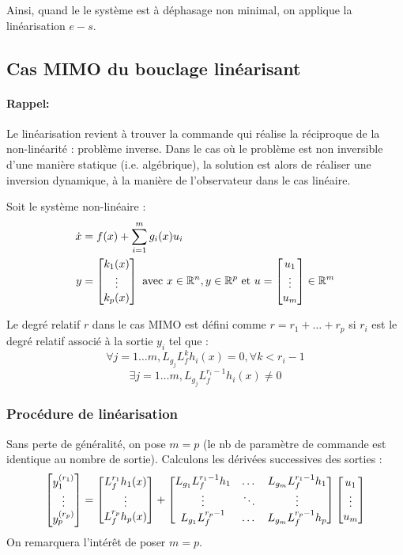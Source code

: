 \documentclass[main.tex]{subfiles}
\begin{document}
Ainsi, quand le le système est à déphasage non minimal, on applique la linéarisation $e-s$.


\subsection{Cas MIMO du bouclage linéarisant}
\paragraph{Rappel:}
Le linéarisation revient à trouver la commande qui réalise la réciproque de la non-linéarité : problème inverse. Dans le cas où le problème est non inversible d'une manière statique (i.e. algébrique), la solution est alors de réaliser une inversion dynamique, à la manière de  l'observateur dans le cas linéaire.

Soit le système non-linéaire :
\begin{align*}
\dot{x} & = f(x) + \sum_{i=1}^m g_i(x)u_i \\
y & = \begin{bmatrix} k_1(x) \\ \vdots \\ k_p(x) \end{bmatrix} \text{ avec } x\in\mathbb{R}^n,y \in \mathbb{R}^p \text{ et } u=\begin{bmatrix} u_1 \\ \vdots \\ u_m \end{bmatrix} \in \mathbb{R}^m 
\end{align*} 

\begin{defin}
Le degré relatif $r$ dans le cas MIMO est défini comme $r=r_1+\dots+r_p$ si $r_i$ est le degré relatif associé à la sortie $y_i$ tel que :
\[ \forall j=1\dots m, L_{g_j}L_f^k h_i(x) = 0, \forall k < r_i-1\]
\[ \exists j =1\dots m, L_{g_j}L_f^{r_i-1} h_i(x) \neq 0\]
\end{defin}

\subsubsection{Procédure de linéarisation}
Sans perte de généralité, on pose $m=p$ (le nb de paramètre de commande est identique au nombre de sortie). Calculons les dérivées successives des sorties :
\[
\begin{bmatrix}  y_1^{(r_1)} \\ \vdots \\ y_p^{(r_p)} \end{bmatrix} =
\begin{bmatrix}  L_f^{r_1} h_1(x) \\ \vdots \\ L_f^{r_p}h_p(x)  \end{bmatrix} +
\begin{bmatrix}
  L_{g_1}L_f^{r_1-1}h_1 & \dots & L_{g_m}L_f^{r_1 - 1} h_1 \\
  \vdots                     & \ddots     & \vdots                        \\
  L_{g_1}L_f^{r_p-1}    & \dots & L_{g_m}L_f^{r_p-1} h_p
\end{bmatrix}
\begin{bmatrix} u_1 \\ \vdots \\ u_m \end{bmatrix}
\]
On remarquera l'intérêt de poser $m=p$.
\end{document}
